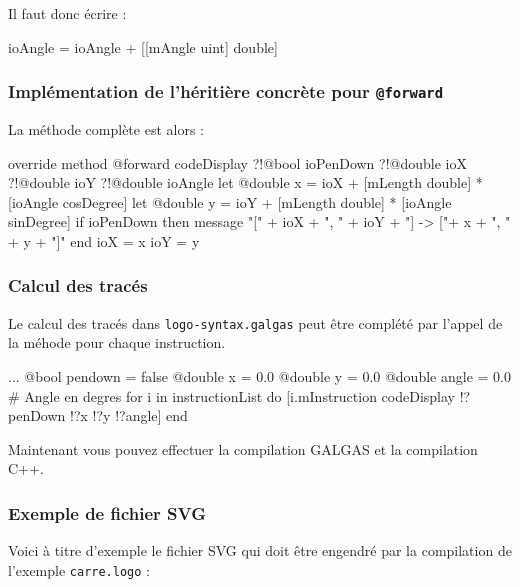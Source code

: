  Il faut donc écrire :
\begin{galgascode}
ioAngle = ioAngle + [[mAngle uint] double]
\end{galgascode}

\subsubsection{Implémentation de l'héritière concrète pour \texttt{@forward}}
La méthode complète est alors :

\begin{galgascode}
override method @forward codeDisplay
  ?!@bool ioPenDown
  ?!@double ioX
  ?!@double ioY
  ?!@double ioAngle
{
  let @double x = ioX + [mLength double] * [ioAngle cosDegree]
  let @double y = ioY + [mLength double] * [ioAngle sinDegree]
  if ioPenDown then
    message "[" + ioX + ", " + ioY + "] -> ["+ x + ", " + y + "]\n"
  end
  ioX = x
  ioY = y
}
\end{galgascode}

\subsubsection{Calcul des tracés}
Le calcul des tracés dans \texttt{logo-syntax.galgas} peut être complété par l'appel de la méhode  pour chaque instruction.
\begin{galgascode}
  ...
  @bool pendown = false
  @double x = 0.0
  @double y = 0.0
  @double angle = 0.0 # Angle en degres
  for i in instructionList do
    [i.mInstruction codeDisplay !?penDown !?x !?y !?angle]
  end
\end{galgascode}

Maintenant vous pouvez effectuer la compilation GALGAS et la compilation C++.

\subsubsection{Exemple de fichier SVG}
Voici à titre d'exemple le fichier SVG qui doit être engendré par la compilation de l'exemple \texttt{carre.logo} :



